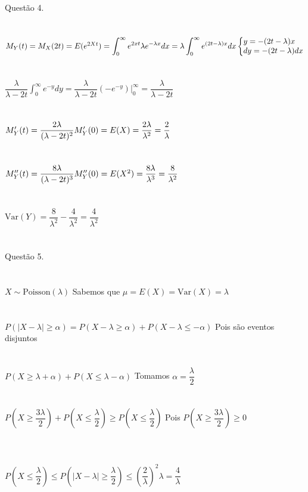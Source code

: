 \documentclass[12pt]{article}
\begin{document}
\indent Questão 4.\\\\\\
$M_{Y}(t) = M_{X}(2t) = E(e^{2Xt}) = \displaystyle \int_{0}^{\infty} e^{2xt} \lambda e^{-\lambda x} dx = \lambda \int_{0}^{\infty} e^{(2t-\lambda)x} dx \hfill
\left \{\begin{array}{@{}l@{}}
	y = -(2t-\lambda)x\\
	dy = -(2t-\lambda)dx
\end{array}\right.$\\\\\\
$\dfrac{\lambda}{\lambda-2t} \displaystyle \int_{0}^{\infty} e^{-y} dy = \dfrac{\lambda}{\lambda-2t}(-e^{-y})\biggr|^{\infty}_{0} = \dfrac{\lambda}{\lambda-2t}$\\\\\\
$M_{Y}'(t) = \dfrac{2\lambda}{(\lambda-2t)^{2}} \hfill M_{Y}'(0) = E(X) = \dfrac{2\lambda}{\lambda^{2}} = \dfrac{2}{\lambda}$\\\\\\
$M_{Y}''(t) = \dfrac{8\lambda}{(\lambda-2t)^{3}} \hfill M_{Y}''(0) = E(X^{2}) = \dfrac{8\lambda}{\lambda^{3}} = \dfrac{8}{\lambda^{2}}$\\\\\\
$\text{Var}(Y) = \dfrac{8}{\lambda^{2}} - \dfrac{4}{\lambda^{2}} = \dfrac{4}{\lambda^{2}}$\\\\\\

\indent Questão 5.\\\\\\
$X \sim \text{Poisson}(\lambda)$ \quad Sabemos que $\mu = E(X) = \text{Var}(X) = \lambda$\\\\\\
$P(|X-\lambda| \geq \alpha) = P(X-\lambda \geq \alpha) + P(X-\lambda \leq -\alpha)$ \hfill Pois são eventos disjuntos\\\\\\
$P(X \geq \lambda+\alpha) + P(X \leq \lambda-\alpha)$ \hfill Tomamos $\alpha = \dfrac{\lambda}{2}$\\\\\\
$P\left(X \geq \dfrac{3\lambda}{2}\right) + P\left(X \leq \dfrac{\lambda}{2}\right) \geq P\left(X \leq \dfrac{\lambda}{2}\right)$ \hfill Pois $P\left(X \geq \dfrac{3\lambda}{2}\right) \geq 0$\\\\\\\\
$P\left(X \leq \dfrac{\lambda}{2}\right) \leq P\left(|X-\lambda| \geq \dfrac{\lambda}{2}\right) \leq \left(\dfrac{2}{\lambda}\right)^{2}\lambda = \dfrac{4}{\lambda}$\\\\\\
\end{document}
